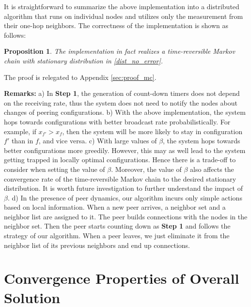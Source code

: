 \documentclass[10pt,conference]{IEEEtran}
\newtheorem{proposition}{\bf Proposition}
\begin{document}
It is straightforward to summarize the above implementation into a distributed algorithm that runs on individual nodes and utilizes only the measurement from their one-hop neighbors. The correctness of the implementation is shown as follows:
\begin{proposition}
\label{implement_mc} The implementation in fact realizes a time-reversible
Markov chain with stationary distribution in \eqref{dist_no_error}.
\end{proposition}
The proof is relegated to Appendix \ref{sec:proof_mc}.

\textbf{Remarks:} a) In \textbf{Step 1}, the generation of count-down
timers does not depend on the receiving rate, thus the system does
not need to notify the nodes about changes of peering configurations.
b) With the above implementation, the system hops towards configurations
with better broadcast rate probabilistically. For example, if $x_{f'}>x_{f}$,
then the system will be more likely to stay in configuration $f'$
than in $f$, and vice versa. c) With large values of $\beta$, the system
hops towards better configurations more greedily. However,
this may as well lead to the system getting trapped in locally optimal configurations.
Hence there is a trade-off to consider when setting the value of $\beta$.
Moreover, the value of $\beta$ also affects the convergence rate
of the time-reversible Markov chain to the desired stationary distribution.
It is worth future investigation to further understand the impact
of $\beta$. d) In the presence of peer dynamics, our algorithm incurs only simple actions based on local information. When a new peer arrives, a neighbor set and a neighbor list are assigned
to it. The peer builds connections with the nodes in the neighbor set. Then the peer starts counting down as \textbf{Step 1} and follows the strategy of our algorithm. When a peer leaves, we just eliminate it from the neighbor list of its previous neighbors and end up connections.

\section{Convergence Properties of Overall Solution}

\label{sec:bp+ma}
\end{document}
